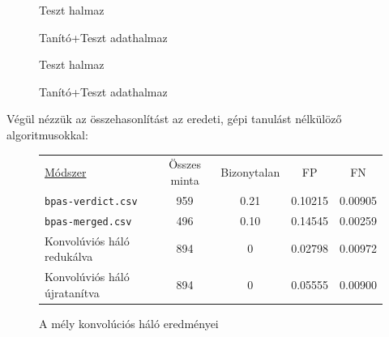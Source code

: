 \begin{figure}[ht]
	
	
	\begin{minipage}[c]{0.5\linewidth}
		
		\caption{Teszt halmaz}
		\label{fig:roc-test-re}
		
	\end{minipage}\hfill
	\begin{minipage}[c]{0.5\linewidth}
		
		\caption{Tanító+Teszt adathalmaz}
		\label{fig:roc-full-re}
		
	\end{minipage}
	\label{fig:ujratanitott.feladat}
\end{figure}



\begin{figure}[ht]
	
	
	\begin{minipage}[c]{0.5\linewidth}
		
		\caption{Teszt halmaz}\label{fig:hist-test}
		
	\end{minipage}\hfill
	\begin{minipage}[c]{0.5\linewidth}
		
		\caption{Tanító+Teszt adathalmaz}\label{fig:hist-full}
		
	\end{minipage}
	\label{fig:histogram-ujratanitott}
\end{figure}


Végül nézzük az összehasonlítást az eredeti, gépi tanulást nélkülöző algoritmusokkal:

\begin{figure} [h!]
	\centering
	\begin{tabular}{ l c c c c  }
		\underline{Módszer} 			& Összes minta 	& Bizonytalan	& FP	& FN \\
		\texttt{bpas-verdict.csv}\footnotemark 	& 959 			& 0.21			& 0.10215 	& 0.00905 	\\
		\texttt{bpas-merged.csv}\footnotemark[\value{footnote}]  	& 496			& 0.10			& 0.14545 	& 0.00259   \\
		
		\hline
		Konvolúviós háló redukálva\footnotemark 	& 894			& 0				& 0.02798	& 0.00972	\\
		Konvolúviós háló újratanítva& 894			& 0				& 0.05555	& 0.00900	\\
		
		
	\end{tabular} 

	\caption{A mély konvolúciós háló eredményei}
\end{figure}

